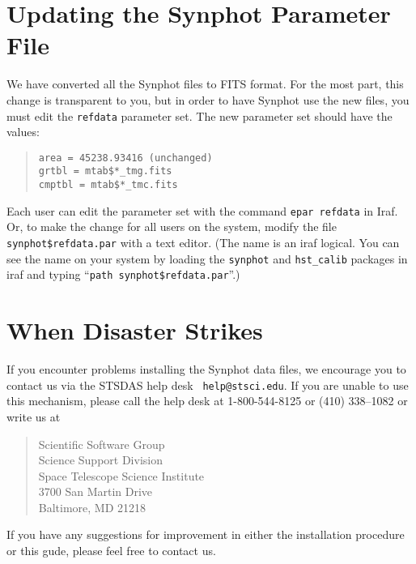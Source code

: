 \documentclass{article}
\begin{document}
\section{Updating the Synphot Parameter File}

We have converted all the Synphot files to FITS format. For the most
part, this change is transparent to you, but in order to have Synphot
use the new files, you must edit the {\tt refdata} parameter set. The
new parameter set should have the values:

\begin{quote}\begin{verbatim}
area = 45238.93416 (unchanged)
grtbl = mtab$*_tmg.fits
cmptbl = mtab$*_tmc.fits
\end{verbatim}\end{quote}

Each user can edit the parameter set with the command {\tt epar
refdata} in Iraf. Or, to make the change for all users on the system,
modify the file {\tt synphot\$refdata.par} with a text editor. (The
name is an iraf logical. You can see the name on your system by
loading the {\tt synphot} and {\tt hst\_calib} packages in iraf and
typing ``{\tt path synphot\$refdata.par}''.)

\section{When Disaster Strikes}

If you encounter problems installing the Synphot data files, we
encourage you to contact us via the STSDAS help desk {\tt
help@stsci.edu}.  If you are unable to use this mechanism, please call
the help desk at 1-800-544-8125 or (410) 338--1082 or write us at

\begin{quote}
Scientific Software Group\\
Science Support Division\\
Space Telescope Science Institute\\
3700 San Martin Drive\\
Baltimore, MD 21218
\end{quote}

If you have any suggestions for improvement in either the installation
procedure or this gude, please feel free to contact us.
\end{document}
